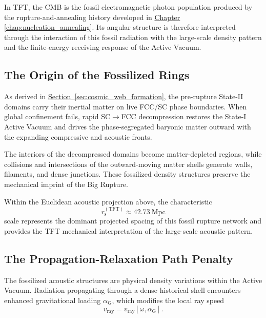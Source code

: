In TFT, the CMB is the fossil electromagnetic photon population produced by the rupture-and-annealing history developed in \hyperref[chap:nucleation_annealing]{Chapter \ref*{chap:nucleation_annealing}}. Its angular structure is therefore interpreted through the interaction of this fossil radiation with the large-scale density pattern and the finite-energy receiving response of the Active Vacuum.


\subsection{The Origin of the Fossilized Rings}

As derived in
\hyperref[sec:cosmic_web_formation]{Section~\ref*{sec:cosmic_web_formation}},
the pre-rupture State-II domains carry their inertial matter on live FCC/SC phase boundaries. When global confinement fails, rapid SC$\rightarrow$FCC decompression restores the State-I Active Vacuum and drives the phase-segregated baryonic matter outward with the expanding compressive and acoustic fronts.

The interiors of the decompressed domains become matter-depleted regions, while collisions and intersections of the outward-moving matter shells generate walls, filaments, and dense junctions. These fossilized density structures preserve the mechanical imprint of the Big Rupture.

Within the Euclidean acoustic projection above, the characteristic
\begin{equation}
    r_{\mathrm s}^{(\mathrm{TFT})}
    \approx
    42.73\ \mathrm{Mpc}
\end{equation}
scale represents the dominant projected spacing of this fossil rupture network and provides the TFT mechanical interpretation of the large-scale acoustic pattern.


\subsection{The Propagation-Relaxation Path Penalty}

The fossilized acoustic structures are physical density variations within the Active Vacuum. Radiation propagating through a dense historical shell encounters enhanced gravitational loading $\alpha_{\mathrm G}$, which modifies the local ray speed
\begin{equation}
    v_{\mathrm{ray}}
    =
    v_{\mathrm{ray}}
    \left[
        \omega,
        \alpha_{\mathrm G}
    \right].
\end{equation}


